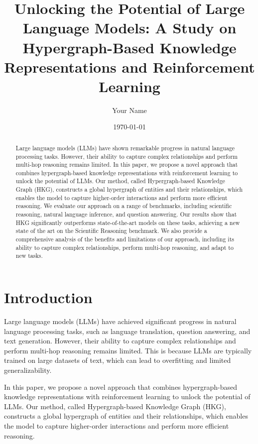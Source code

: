 \documentclass[11pt]{article}
\begin{document}
        \title{Unlocking the Potential of Large Language Models: A Study on Hypergraph-Based Knowledge Representations and Reinforcement Learning}

        \author{Your Name}
        \date{\today}

        \maketitle

        \begin{abstract}
        Large language models (LLMs) have shown remarkable progress in natural language processing tasks. However, their ability to capture complex relationships and perform multi-hop reasoning remains limited. In this paper, we propose a novel approach that combines hypergraph-based knowledge representations with reinforcement learning to unlock the potential of LLMs. Our method, called Hypergraph-based Knowledge Graph (HKG), constructs a global hypergraph of entities and their relationships, which enables the model to capture higher-order interactions and perform more efficient reasoning. We evaluate our approach on a range of benchmarks, including scientific reasoning, natural language inference, and question answering. Our results show that HKG significantly outperforms state-of-the-art models on these tasks, achieving a new state of the art on the Scientific Reasoning benchmark. We also provide a comprehensive analysis of the benefits and limitations of our approach, including its ability to capture complex relationships, perform multi-hop reasoning, and adapt to new tasks.

        \end{abstract}

        \section{Introduction}

        Large language models (LLMs) have achieved significant progress in natural language processing tasks, such as language translation, question answering, and text generation. However, their ability to capture complex relationships and perform multi-hop reasoning remains limited. This is because LLMs are typically trained on large datasets of text, which can lead to overfitting and limited generalizability.

        In this paper, we propose a novel approach that combines hypergraph-based knowledge representations with reinforcement learning to unlock the potential of LLMs. Our method, called Hypergraph-based Knowledge Graph (HKG), constructs a global hypergraph of entities and their relationships, which enables the model to capture higher-order interactions and perform more efficient reasoning.
\end{document}
